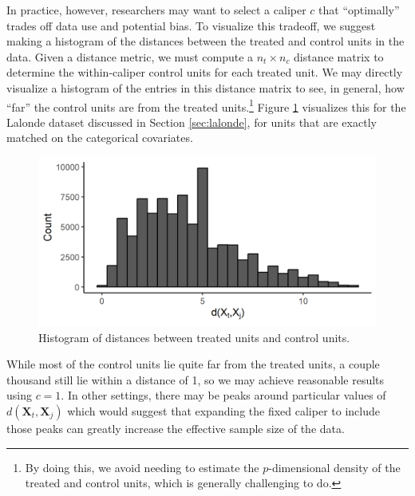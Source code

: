 \documentclass{article}
\newcommand{\Xt}{\mathbf{X}_t}
\newcommand{\Xj}{\mathbf{X}_j}
\begin{document}
In practice, however, researchers may want to select a caliper $c$ that ``optimally'' trades off data use and potential bias.
To visualize this tradeoff, we suggest making a histogram of the distances between the treated and control units in the data.
Given a distance metric, we must compute a $n_t \times n_c$ distance matrix to determine the within-caliper control units for each treated unit.
We may directly visualize a histogram of the entries in this distance matrix to see, in general, how ``far'' the control units are from the treated units.\footnote{By doing this, we avoid needing to estimate the $p$-dimensional density of the treated and control units, which is generally challenging to do.}
Figure \ref{fig:lalonde_calselect} visualizes this for the Lalonde dataset discussed in Section \ref{sec:lalonde}, for units that are exactly matched on the categorical covariates.
\begin{figure}[t]
    \centering
    \includegraphics[width=\textwidth]{writeup/figures/lalonde_calselect.png}
    \caption{Histogram of distances between treated units and control units.}
    \label{fig:lalonde_calselect}
\end{figure}
While most of the control units lie quite far from the treated units, a couple thousand still lie within a distance of 1, so we may achieve reasonable results using $c=1$.
In other settings, there may be peaks around particular values of $d(\Xt, \Xj)$ which would suggest that expanding the fixed caliper to include those peaks can greatly increase the effective sample size of the data.


\end{document}
